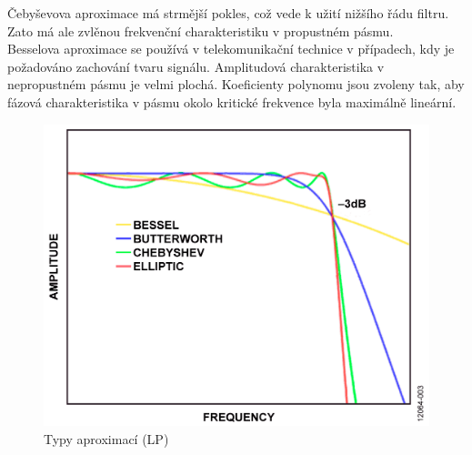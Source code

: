 \documentclass[twoside]{article}
\begin{document}
Čebyševova aproximace má strmější pokles, což vede k užití nižšího řádu filtru. Zato má ale zvlěnou frekvenční charakteristiku v propustném pásmu. \\
Besselova aproximace se používá v telekomunikační technice v případech, kdy je požadováno zachování tvaru signálu. Amplitudová charakteristika v nepropustném pásmu je velmi plochá. Koeficienty polynomu jsou zvoleny tak, aby fázová charakteristika v pásmu okolo kritické frekvence byla maximálně lineární.
\begin{figure}[H]
\centering
\includegraphics[scale=0.6]{LGA98.gif}
\caption{Typy aproximací (LP)\cite{2}}
\end{figure}
\end{document}
